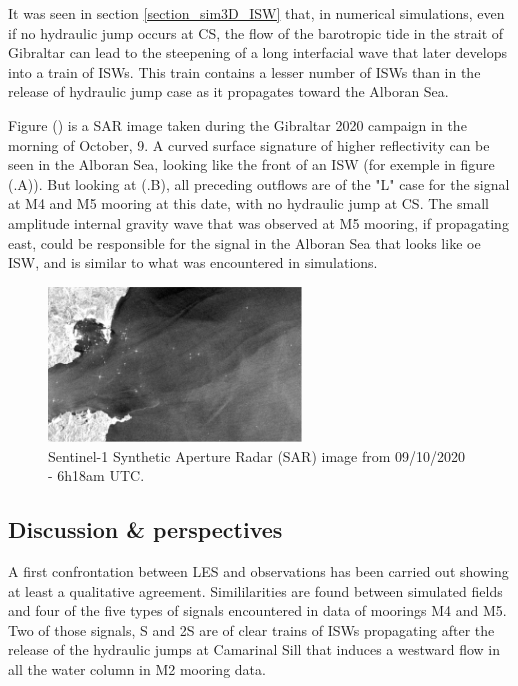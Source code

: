 It was seen in section \ref{section_sim3D_ISW} that, in numerical simulations, even if no hydraulic jump occurs at CS, the flow of the barotropic tide in the strait of Gibraltar can lead to the steepening of a long interfacial wave that later develops into a train of ISWs. This train contains a lesser number of ISWs than in the release of hydraulic jump case as it propagates toward the Alboran Sea. 

Figure () is a SAR image taken during the Gibraltar 2020 campaign in the morning of October, 9. A curved surface signature of higher reflectivity can be seen in the Alboran Sea, looking like the front of an ISW (for exemple in figure (.A)). But looking at (.B), all preceding outflows are of the "L" case for the signal at M4 and M5 mooring at this date, with no hydraulic jump at CS. The small amplitude internal gravity wave that was observed at M5 mooring, if propagating east, could be responsible for the signal in the Alboran Sea that looks like oe ISW, and is similar to what was encountered in simulations.

\begin{figure}[!h]
 \includegraphics[width=0.6\textwidth]{./GBR3D/SAR_OBS_GEPETO.png}
 \caption {Sentinel-1 Synthetic Aperture Radar (SAR) image from 09/10/2020 - 6h18am UTC.}
 \label{fig_SAROBS}
\end{figure}


\subsection{Discussion \& perspectives}

A first confrontation between LES and observations has been carried out showing at least a qualitative agreement. Simililarities are found between simulated fields and four of the five types of signals encountered in data of moorings M4 and M5. Two of those signals, S and 2S are of clear trains of ISWs propagating after the release of the hydraulic jumps at Camarinal Sill that induces a westward flow in all the water column in M2 mooring data. 

